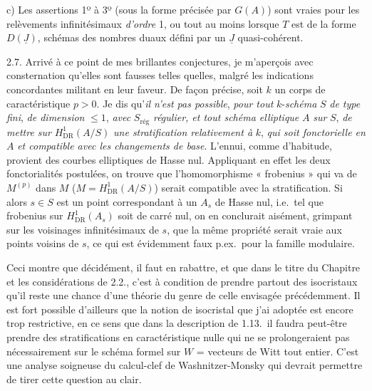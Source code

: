 \documentclass[11pt,a4paper]{article}
\begin{document}
c) Les assertions 1º à 3º (sous la forme précisée par $G(A)$) sont vraies pour
les relèvements infinitésimaux \emph{d'ordre} 1, ou tout au moins lorsque $T$
est de la forme $D(\underline{J})$, schémas des nombres duaux défini par un
$\underline{J}$ quasi-cohérent.

2.7. Arrivé à ce point de mes brillantes conjectures, je m'aperçois avec
consternation qu'elles sont fausses telles quelles, malgré les indications
concordantes militant en leur faveur. De façon précise, soit $k$ un corps de
caractéristique  $p>0$. Je dis qu'\emph{il n'est pas possible},
\emph{pour tout} $k$-\emph{schéma} $S$ \emph{de type fini}, \emph{de dimension}
$\leqslant 1$, \emph{avec} $S_{\text{rég}}$ \emph{régulier, et tout schéma
elliptique} $A$ \emph{sur} $S$, \emph{de mettre sur} $H^1_{\mathrm{DR}}(A/S)$
\emph{une stratification relativement à} $k$, \emph{qui soit fonctorielle en}
$A$ \emph{et compatible avec les changements de base}. L'ennui, comme d'habitude, provient des courbes
elliptiques de Hasse nul. Appliquant en effet les deux fonctorialités
postulées, on trouve que l'homomorphisme « frobenius » qui va de $M^{(p)}$
dans $M$ ($M=H^1_{\mathrm{DR}}(A/S)$) serait compatible avec la
stratification. Si alors $s\in S$ est un point correspondant à un $A_s$ de
Hasse nul, i.e.\ tel que frobenius sur $H^1_{\mathrm{DR}}(A_s)$ soit de carré
nul, on en conclurait aisément, grimpant sur les voisinages infinitésimaux de
$s$, que la même propriété serait vraie aux points voisins de $s$, ce qui est
évidemment faux p.ex.\ pour la famille modulaire.

Ceci montre que décidément, il faut en rabattre, et que dans le titre du
Chapitre et les considérations de 2.2., c'est à condition de prendre partout
des isocristaux qu'il reste une chance d'une théorie du genre de celle
envisagée précédemment. Il est fort possible d'ailleurs que la notion de
isocristal que j'ai adoptée est encore trop restrictive, en ce sens que dans
la description de 1.13.\ il faudra peut-être prendre des stratifications en
caractéristique nulle qui ne se prolongeraient pas nécessairement sur le
schéma formel sur $W$ = vecteurs de Witt tout entier. C'est une analyse
soigneuse du calcul-clef de Washnitzer-Monsky qui devrait permettre de tirer
cette question au clair.
\end{document}
